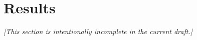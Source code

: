 \section{Results}
\label{sec:results}
\textit{[This section is intentionally incomplete in the current draft.]}
